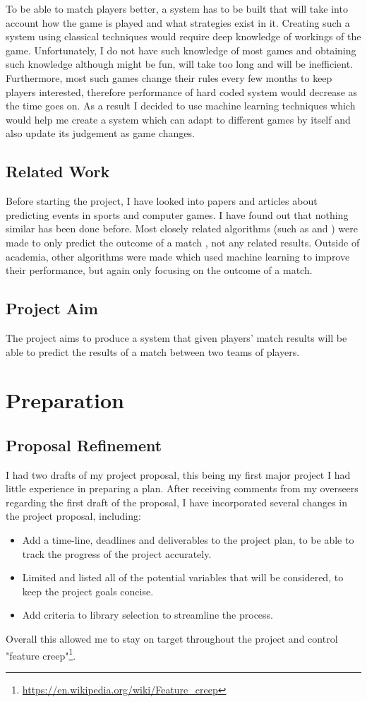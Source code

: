 \documentclass[12pt,a4paper]{book}
\begin{document}
To be able to match players better, a system has to be built that will take into account how the game is played and what strategies exist in it.
Creating such a system using classical techniques would require deep knowledge of workings of the game.
Unfortunately, I do not have such knowledge of most games and obtaining such knowledge although might be fun, will take too long and will be inefficient.
Furthermore, most such games change their rules every few months to keep players interested, therefore performance of hard coded system would decrease as the time goes on.
As a result I decided to use machine learning techniques which would help me create a system which can adapt to different games by itself and also update its judgement as game changes.

\section{Related Work}
Before starting the project, I have looked into papers and articles about predicting events in sports and computer games.
I have found out that nothing similar has been done before.
Most closely related algorithms (such as \cite{trueskill} and \cite{bayesianranking}) were made to only predict the outcome of a match , not any related results.
Outside of academia, other algorithms were made which used machine learning to improve their performance, but again only focusing on the outcome of a match.

\section{Project Aim}
The project aims to produce a system that given players' match results will be able to predict the results of a match between two teams of players.

\makeatother
\chapter{Preparation}
\section{Proposal Refinement}
I had two drafts of my project proposal, this being my first major project I had little experience in preparing a plan.
After receiving comments from my overseers regarding the first draft of the proposal, I have incorporated several changes in the project proposal, including:
\begin{itemize}
\item Add a time-line, deadlines and deliverables to the project plan, to be able to track the progress of the project accurately.
\item Limited and listed all of the potential variables that will be considered, to keep the project goals concise.
\item Add criteria to library selection to streamline the process.
\end{itemize}
Overall this allowed me to stay on target throughout the project and control "feature creep"\footnote{\url{https://en.wikipedia.org/wiki/Feature_creep}}.
\end{document}
